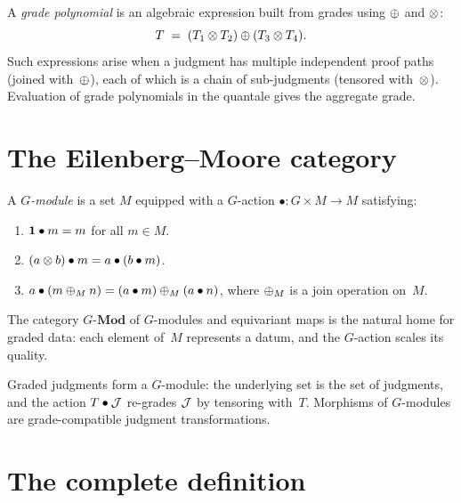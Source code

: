 \begin{definition}
\label{def:grade-poly}
A \emph{grade polynomial} is an algebraic expression built from grades
using $\oplus$ and $\otimes$:
\[
  T \;=\; (T_1 \otimes T_2) \oplus (T_3 \otimes T_4).
\]
Such expressions arise when a judgment has multiple independent proof
paths (joined with~$\oplus$), each of which is a chain of sub-judgments
(tensored with~$\otimes$).  Evaluation of grade polynomials in the
quantale gives the aggregate grade.
\end{definition}

\section{The Eilenberg--Moore category}
\label{sec:eilenberg-moore}

\begin{definition}[$G$-modules]
\label{def:g-module}
A \emph{$G$-module} is a set $M$ equipped with a $G$-action
$\bullet : G \times M \to M$ satisfying:
\begin{enumerate}[label=(\alph*),nosep]
\item $\mathbf{1} \bullet m = m$ for all $m \in M$.
\item $(a \otimes b) \bullet m = a \bullet (b \bullet m)$.
\item $a \bullet (m \oplus_M n) = (a \bullet m) \oplus_M (a \bullet n)$,
  where $\oplus_M$ is a join operation on~$M$.
\end{enumerate}
The category $G\text{-}\mathbf{Mod}$ of $G$-modules and equivariant
maps is the natural home for graded data: each element of~$M$
represents a datum, and the $G$-action scales its quality.
\end{definition}

\begin{remark}
Graded judgments form a $G$-module: the underlying set is the set of
judgments, and the action $T \bullet \mathcal{J}$ re-grades $\mathcal{J}$ by
tensoring with~$T$.  Morphisms of $G$-modules are grade-compatible
judgment transformations.
\end{remark}

\section{The complete definition}

